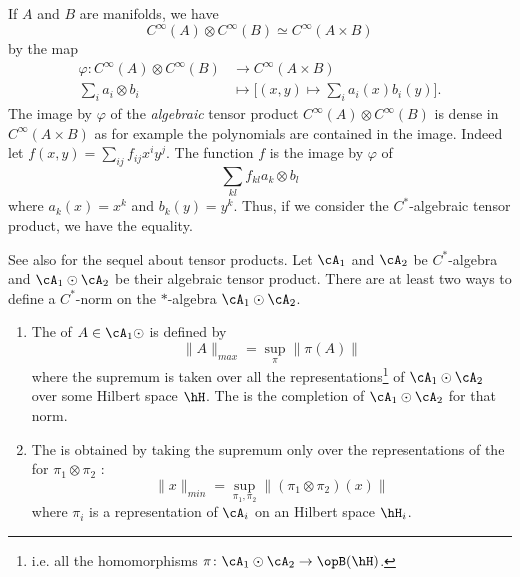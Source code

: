 If $A$ and $B$ are manifolds, we have
\begin{equation}
    C^{\infty}(A)\otimes C^{\infty}(B)\simeq C^{\infty}(A\times B)
\end{equation}
by the map
\begin{equation}        \label{EqIsoCABCACBCstar}
    \begin{aligned}
        \varphi\colon  C^{\infty}(A)\otimes C^{\infty}(B)&\to  C^{\infty}(A\times B) \\
        \sum_ia_i\otimes b_i&\mapsto \Big[ (x,y)\mapsto\sum_ia_i(x)b_i(y) \Big]. 
    \end{aligned}
\end{equation}
The image by $\varphi$ of the \emph{algebraic} tensor product $ C^{\infty}(A)\otimes C^{\infty}(B)$ is dense in $ C^{\infty}(A\times B)$ as for example the polynomials are contained in the image. Indeed let $f(x,y)=\sum_{ij}f_{ij}x^iy^j$. The function $f$ is the image by $\varphi$ of
\begin{equation}        \label{EqDecompffklCABCACB}
    \sum_{kl} f_{kl} a_k\otimes b_l
\end{equation}
where $a_k(x)=x^k$ and $b_k(y)=y^k$. Thus, if we consider the $C^*$-algebraic tensor product, we have the equality.

See also \cite{Delaroche} for the sequel about tensor products. Let $\cA_1$ and $\cA_2$ be $C^*$-algebra and $\cA_1\odot\cA_2$ be their algebraic tensor product. There are at least two ways to define a $C^*$-norm on the $*$-algebra $\cA_1\odot\cA_2$.

\begin{enumerate}
    \item
        The  of $A\in\cA_1\odot$ is defined by
        \begin{equation}
            \| A \|_{max}=\sup_{\pi}\| \pi(A) \|
        \end{equation}
        where the supremum is taken over all the representations\footnote{i.e. all the homomorphisms $\pi\colon \cA_1\odot\cA_2\to \opB(\hH)$.} of $\cA_1\odot\cA_2$ over some Hilbert space $\hH$. The  is the completion of $\cA_1\odot\cA_2$ for that norm.

    \item
        The  is obtained by taking the supremum only over the representations of the for $\pi_1\otimes \pi_2$ :
        \begin{equation}
            \| x \|_{min}=\sup_{\pi_1,\pi_2}\| (\pi_1\otimes\pi_2)(x) \|
        \end{equation}
        where $\pi_i$ is a representation of $\cA_i$ on an Hilbert space $\hH_i$.
\end{enumerate}

